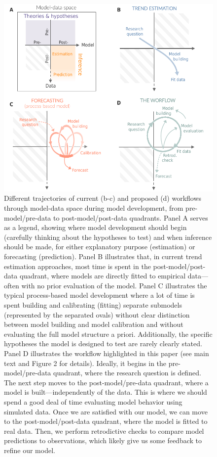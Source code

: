 \documentclass[11pt]{article}
\begin{document}
\begin{figure}
	\centering
	\includegraphics{../figures/figure_modeldataspaces_revised}
	\caption{Different trajectories of current (b-c) and proposed (d) workflows through model-data space during model development, from pre-model/pre-data to post-model/post-data quadrants.
	Panel A serves as a legend, showing where model development should begin (carefully thinking about the hypotheses to test) and when inference should be made, for either explanatory purpose (estimation) or forecasting (prediction).
	Panel B illustrates that, in current trend estimation approaches, most time is spent in the post-model/post-data quadrant, where models are directly fitted to empirical data---often with no prior evaluation of the model.
	Panel C illustrates the typical process-based model development where a lot of time is spent building and calibrating (fitting) separate submodels (represented by the separated ovals) without clear distinction between model building and model calibration and without evaluating the full model structure a priori. Additionally, the specific hypotheses the model is designed to test are rarely clearly stated.
	Panel D illustrates the workflow highlighted in this paper (see main text and Figure 2 for details). Ideally, it begins in the pre-model/pre-data quadrant, where the research question is defined. The next step moves to the post-model/pre-data quadrant, where a model is built---independently of the data. This is where we should spend a good deal of time evaluating model behavior using simulated data. Once we are satisfied with our model, we can move to the post-model/post-data quadrant, where the model is fitted to real data. Then, we perform retrodictive checks to compare model predictions to observations, which likely give us some feedback to refine our model.}
	\label{fig:modeldata}
\end{figure}
\end{document}
